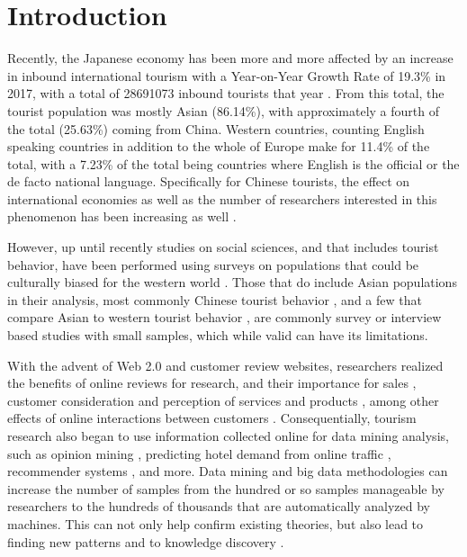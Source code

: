 \documentclass[review]{elsarticle}
\begin{document}
\linenumbers

\section{Introduction}\label{intro}

Recently, the Japanese economy has been more and more affected by an increase in inbound international tourism \cite[][]{jones2009} with a Year-on-Year Growth Rate of 19.3\% in 2017, with a total of \num[group-separator={,}]{28691073} inbound tourists that year \cite[][]{jnto2003-2019}. From this total, the tourist population was mostly Asian (86.14\%), with approximately a fourth of the total (25.63\%) coming from China. Western countries, counting English speaking countries in addition to the whole of Europe make for 11.4\% of the total, with a 7.23\% of the total being countries where English is the official or the de facto national language. Specifically for Chinese tourists, the effect on international economies as well as the number of researchers interested in this phenomenon has been increasing as well \cite[][]{sun2017}. 

However, up until recently studies on social sciences, and that includes tourist behavior, have been performed using surveys on populations that could be culturally biased for the western world \cite[][]{nielsen2017, jones2010WEIRD, guaratne2009, hogan1978biases}. Those that do include Asian populations in their analysis, most commonly Chinese tourist behavior \cite[e.g.][]{liu2019, chang2010, dongyang2015}, and a few that compare Asian to western tourist behavior \cite[e.g.][]{choi2000}, are commonly survey or interview based studies with small samples, which while valid can have its limitations. 

With the advent of Web 2.0 and customer review websites, researchers realized the benefits of online reviews for research, and their importance for sales  \cite[][]{ye2009, basuroy2003}, customer consideration \cite[][]{vermeulen2009} and perception of services and products \cite[][]{browning2013}, among other effects of online interactions between customers \cite[e.g.][]{xiang2010, ren2019}. Consequentially, tourism research also began to use information collected online for data mining analysis, such as opinion mining \cite[e.g.][]{hu2017436}, predicting hotel demand from online traffic \cite[][]{yang2014}, recommender systems \cite[e.g.][]{loh2003}, and more. Data mining and big data methodologies can increase the number of samples from the hundred or so samples manageable by researchers to the hundreds of thousands that are automatically analyzed by machines. This can not only help confirm existing theories, but also lead to finding new patterns and to knowledge discovery \cite[][]{fayyad1996data}. 
\end{document}
